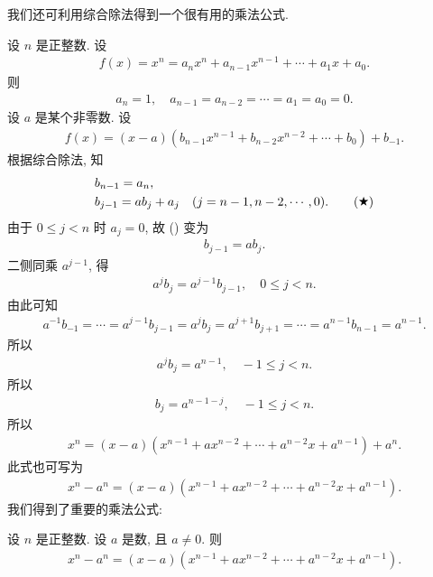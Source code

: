 \myLine

我们还可利用综合除法得到一个很有用的乘法公式.

设 $n$ 是正整数. 设
\begin{align*}
    f(x) = x^n = a_n x^n + a_{n-1} x^{n-1} + \cdots + a_1 x + a_0.
\end{align*}
则
\begin{align*}
    a_n = 1, \quad a_{n-1} = a_{n-2} = \cdots = a_1 = a_0 = 0.
\end{align*}
设 $a$ 是某个非零数. 设
\begin{align*}
    f(x) = (x - a) (b_{n-1} x^{n-1} + b_{n-2} x^{n-2} + \cdots + b_0) + b_{-1}.
\end{align*}
根据综合除法, 知
\begin{align*}
     & b_{n-1} = a_n,                                                        \\
     & b_{j-1} = ab_j + a_j \quad (j = n-1,n-2,\cdots,0). \tag*{(\ding{72})}
\end{align*}
由于 $0 \leq j < n$ 时 $a_j = 0$, 故 () 变为
\begin{align*}
    b_{j-1} = ab_j.
\end{align*}
二侧同乘 $a^{j-1}$, 得
\begin{align*}
    a^j b_j = a^{j-1} b_{j-1}, \quad 0 \leq j < n.
\end{align*}
由此可知
\begin{align*}
    a^{-1} b_{-1} = \cdots = a^{j-1} b_{j-1} = a^j b_j = a^{j+1} b_{j+1} = \cdots = a^{n-1} b_{n-1} = a^{n-1}.
\end{align*}
所以
\begin{align*}
    a^j b_j = a^{n-1}, \quad -1 \leq j < n.
\end{align*}
所以
\begin{align*}
    b_j = a^{n-1-j}, \quad -1 \leq j < n.
\end{align*}
所以
\begin{align*}
    x^n = (x - a)(x^{n-1} + ax^{n-2} + \cdots + a^{n-2}x + a^{n-1}) + a^n.
\end{align*}
此式也可写为
\begin{align*}
    x^n - a^n = (x - a)(x^{n-1} + ax^{n-2} + \cdots + a^{n-2}x + a^{n-1}).
\end{align*}
我们得到了重要的乘法公式:
\begin{proposition}
    设 $n$ 是正整数. 设 $a$ 是数, 且 $a \neq 0$. 则
    \begin{align*}
        x^n - a^n = (x - a)(x^{n-1} + ax^{n-2} + \cdots + a^{n-2}x + a^{n-1}).
    \end{align*}
\end{proposition}

